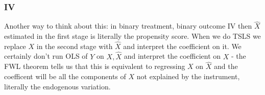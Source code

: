\documentclass{article}
\begin{document}
\subsubsection*{IV}
Another way to think about this: in binary treatment, binary outcome IV then $\hat{X}$ 
estimated in the first stage is literally the  propensity score. When we do TSLS 
we replace $X$ in the second stage with $\hat{X}$ and interpret the coefficient on it. 
We certainly don't run OLS of $Y$ on $X, \hat{X}$ and interpret the coefficient on 
$X$ - the FWL theorem tells us that this is equivalent to regressing $X$ on $\hat{X}$ and 
 the coefficent will be all the components of $X$ not explained by the instrument, 
 literally the endogenous variation.
\end{document}
